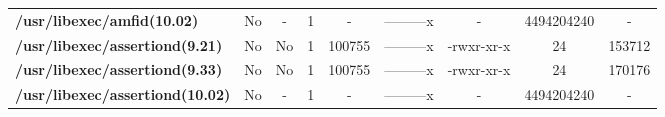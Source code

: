 \begin{center}
{\begin{tabular}{|>{\bfseries} l | C | C | C | C | C | C | C | C |}
					/usr/libexec/amfid(10.02) & No & - & 1 & - & ---------x & - & 4494204240 & -\\ 
					/usr/libexec/assertiond(9.21) & No & No & \color{green}1 & \color{red}100755 & \color{green}---------x & \color{red}-rwxr-xr-x & \color{green}24 & \color{red}153712\\ 
					/usr/libexec/assertiond(9.33) & No & No & \color{green}1 & \color{red}100755 & \color{green}---------x & \color{red}-rwxr-xr-x & \color{green}24 & \color{red}170176\\ 
					/usr/libexec/assertiond(10.02) & No & - & 1 & - & ---------x & - & 4494204240 & -\\ 

			\end{tabular}
		}
	\end{center}



